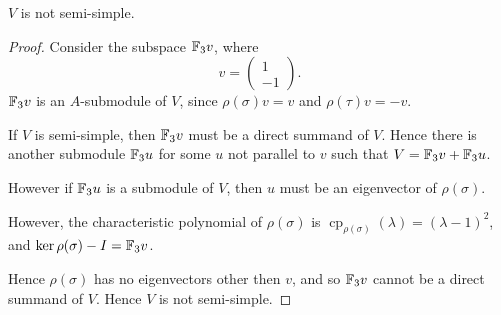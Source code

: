 \documentclass{unswmaths}
\begin{document}
\begin{proposition}
\label{notSemisimple}
    $V$ is not semi-simple.
\end{proposition}
\begin{proof}
    Consider the subspace ${\mathbb{F}_3} v$, where
    \begin{equation*}
        v = \begin{pmatrix}
            1\\-1
        \end{pmatrix}.
    \end{equation*}
    ${\mathbb{F}_3} v$ is an $A$-submodule of $V$, since $\rho(\sigma)v = v$ and 
    $\rho(\tau)v = -v$.
    
    If $V$ is semi-simple, then ${\mathbb{F}_3} v$ must be a direct summand of $V$. Hence there
    is another submodule ${\mathbb{F}_3} u$ for some $u$ not parallel to $v$ such that
    $V = {\mathbb{F}_3} v+{\mathbb{F}_3} u$.
    
    However if ${\mathbb{F}_3} u$ is a submodule of $V$, then $u$ must be an eigenvector
    of $\rho(\sigma)$. 
    
    However, the characteristic polynomial of $\rho(\sigma)$ is 
    $\operatorname{cp}_{\rho(\sigma)}(\lambda) = (\lambda-1)^2$, and $\ker \rho(\sigma)-I = {\mathbb{F}_3} v$.
    
    Hence $\rho(\sigma)$ has no eigenvectors other then $v$, and so ${\mathbb{F}_3} v$ cannot
    be a direct summand of $V$. Hence $V$ is not semi-simple.
\end{proof}
\end{document}
